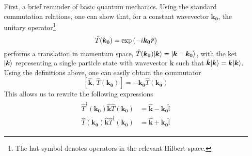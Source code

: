 First, a brief reminder of basic quantum mechanics. Using the standard
commutation relations, one can show that, for a constant wavevector
$\bm{k_0}$, the unitary operator\footnote{The hat symbol denotes
  operators in the relevant Hilbert space.}
%
\begin{equation}\label{eq:trans-oper}
  \hat{T}(\bm{k_0}) = \exp \left( -i \bm{k_0} \hat{\bm{r}} \right)
\end{equation}
% 
performs a translation in momentum space,
$\hat{T}(\bm{k_0}) \vert \bm{k} \rangle = \vert \bm{k} - \bm{k_0} \rangle$, with the
ket $\vert \bm{k} \rangle$ representing a single particle state with
wavevector $\bm{k}$ such that
$\hat{\bm{k}} \vert \bm{k} \rangle = \bm{k} \vert \bm{k} \rangle$. Using the
definitions above, one can easily obtain the commutator
%
\begin{equation}\label{eq:trans-commutator}
  \left[ \hat{\bm{k}},\, \hat{T}(\bm{k_0}) \right] = -\bm{k_0}\hat{T}(\bm{k_0}) 
\end{equation}
%
This allows us to rewrite the following expressions
\begin{align}\label{eq:products}
  \begin{split}
    \hat{T}^{\dagger}(\bm{k_0})\hat{\bm{k}}\hat{T}(\bm{k_0})& = \hat{\bm{k}} - \bm{k_0}\hat{\mathbb{I}}\\
    \hat{T}(\bm{k_0})\hat{\bm{k}}\hat{T}^{\dagger}(\bm{k_0})& = \hat{\bm{k}} + \bm{k_0}\hat{\mathbb{I}}  
  \end{split}
\end{align}

